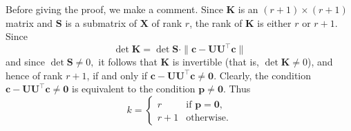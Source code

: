 \documentclass[11pt,a4paper]{article}
\theoremstyle{mybreak}
\numberwithin{dummy}{section}
\theoremstyle{plain}
\theoremstyle{plain}
\theoremstyle{plain}
\theoremstyle{plain}
\theoremstyle{MyNonumberplain}
\DeclareMathOperator*{\rk}{rank}
\DeclareMathOperator{\col}{col}
\newcommand{\0}{\M{0}}
\newcommand{\M}[1]{\mathbf{#1}}
\newcommand{\T}{\top}
\newcommand{\ve}[1]{\mathbf{#1}}
\begin{document}
Before giving the proof, we make a comment. Since $\M{K}$ is an $(r+1) \times (r+1)$ matrix and $\M{S}$ is a submatrix of $\M{X}$ of rank $r$, the rank of $\M{K}$ is either $r$ or $r+1$. Since
\begin{displaymath}
  \det \M{K} = \det \M{S} \cdot 
  \| \ve{c} - \M{U} \M{U}^\T \ve{c} \| 
\end{displaymath}
and since
\begin{math}
  \det \M{S} \neq 0,
\end{math}
it follows that $\M{K}$ is invertible (that is, $\det \M{K} \neq 0$), and hence of rank $r+1$, if and only if
\begin{math}
  \ve{c} - \M{U} \M{U}^\T \ve{c} \neq \0.
\end{math}
Clearly, the condition
\begin{math}
  \ve{c} - \M{U} \M{U}^\T \ve{c} \neq \0
\end{math}
is equivalent to the condition
\begin{math}
  \ve{p} \neq \0.
\end{math}
Thus
\begin{equation}
  \label{eq:7}
  k =
  \begin{cases}
    r & \text{if $\ve{p} = \0$},
    \\
    r + 1 & \text{otherwise}.
  \end{cases}
\end{equation}

\end{document}
